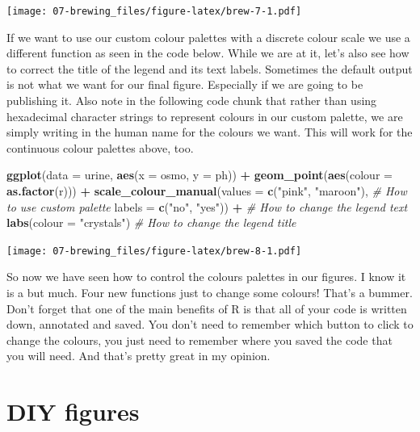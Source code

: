 \documentclass[
]{book}
\newenvironment{Shaded}{\begin{snugshade}}{\end{snugshade}}
\newcommand{\CommentTok}[1]{\textcolor[rgb]{0.56,0.35,0.01}{\textit{#1}}}
\newcommand{\DataTypeTok}[1]{\textcolor[rgb]{0.13,0.29,0.53}{#1}}
\newcommand{\KeywordTok}[1]{\textcolor[rgb]{0.13,0.29,0.53}{\textbf{#1}}}
\newcommand{\NormalTok}[1]{#1}
\newcommand{\OperatorTok}[1]{\textcolor[rgb]{0.81,0.36,0.00}{\textbf{#1}}}
\newcommand{\StringTok}[1]{\textcolor[rgb]{0.31,0.60,0.02}{#1}}
\begin{document}
\texttt{[image: 07-brewing\_files/figure-latex/brew-7-1.pdf]}

If we want to use our custom colour palettes with a discrete colour scale we use a different function as seen in the code below. While we are at it, let's also see how to correct the title of the legend and its text labels. Sometimes the default output is not what we want for our final figure. Especially if we are going to be publishing it. Also note in the following code chunk that rather than using hexadecimal character strings to represent colours in our custom palette, we are simply writing in the human name for the colours we want. This will work for the continuous colour palettes above, too.

\begin{Shaded}
\begin{Highlighting}[]
\KeywordTok{ggplot}\NormalTok{(}\DataTypeTok{data =}\NormalTok{ urine, }\KeywordTok{aes}\NormalTok{(}\DataTypeTok{x =}\NormalTok{ osmo, }\DataTypeTok{y =}\NormalTok{ ph)) }\OperatorTok{+}
\StringTok{  }\KeywordTok{geom\_point}\NormalTok{(}\KeywordTok{aes}\NormalTok{(}\DataTypeTok{colour =} \KeywordTok{as.factor}\NormalTok{(r))) }\OperatorTok{+}
\StringTok{  }\KeywordTok{scale\_colour\_manual}\NormalTok{(}\DataTypeTok{values =} \KeywordTok{c}\NormalTok{(}\StringTok{"pink"}\NormalTok{, }\StringTok{"maroon"}\NormalTok{), }\CommentTok{\# How to use custom palette}
                     \DataTypeTok{labels =} \KeywordTok{c}\NormalTok{(}\StringTok{"no"}\NormalTok{, }\StringTok{"yes"}\NormalTok{)) }\OperatorTok{+}\StringTok{ }\CommentTok{\# How to change the legend text}
\StringTok{  }\KeywordTok{labs}\NormalTok{(}\DataTypeTok{colour =} \StringTok{"crystals"}\NormalTok{) }\CommentTok{\# How to change the legend title}
\end{Highlighting}
\end{Shaded}

\texttt{[image: 07-brewing\_files/figure-latex/brew-8-1.pdf]}

So now we have seen how to control the colours palettes in our figures. I know it is a but much. Four new functions just to change some colours! That's a bummer. Don't forget that one of the main benefits of R is that all of your code is written down, annotated and saved. You don't need to remember which button to click to change the colours, you just need to remember where you saved the code that you will need. And that's pretty great in my opinion.

\hypertarget{diy-figures}{%
\section{DIY figures}\label{diy-figures}}
\end{document}
